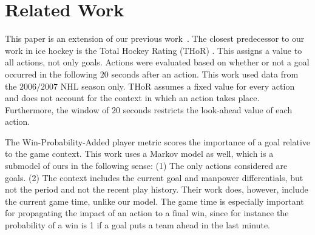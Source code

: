 \documentclass[runningheads,a4paper]{llncs}
\begin{document}
%

\section{Related Work} This paper is an extension of our previous work~\cite{Routley2015a}. The closest predecessor to our work in ice hockey is the Total Hockey Rating (THoR) \cite{Schuckers2013}. This assigns a value to all actions, not only goals. Actions were evaluated based on whether or not a goal occurred in the following $20$ seconds after an action. %
This work used data from the $2006/2007$ NHL season only. THoR assumes a fixed value for every action and does not account for the context in which an action takes place. Furthermore, the window of $20$ seconds restricts the look-ahead value of each action. %

The Win-Probability-Added player metric \cite{Pettigrew2015,Kaplan2014} scores the importance of a goal relative to the game context. This work uses a Markov model as well, which is a submodel of ours in the following sense: (1) The only actions considered are goals. (2) The context includes the current goal and manpower differentials, but not the period and not the recent play history. Their work does, however, include the current game time, unlike our model. The game time is especially important for propagating the impact of an action to a final win, since for instance the probability of a win is 1 if a goal puts a team ahead in the last minute.
\end{document}
